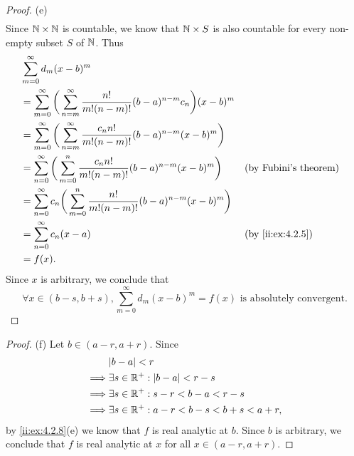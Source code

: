 \begin{proof}{(e)}
\begin{align*}
  \end{align*}
  Since \(\mathbb{N} \times \mathbb{N}\) is countable, we know that \(\mathbb{N} \times S\) is also countable for every non-empty subset \(S\) of \(\mathbb{N}\).
  Thus
  \begin{align*}
     & \sum_{m = 0}^\infty d_m (x - b)^m                                                                                                             \\
     & = \sum_{m = 0}^\infty \bigg(\sum_{n = m}^\infty \dfrac{n!}{m! (n - m)!} (b - a)^{n - m} c_n\bigg) (x - b)^m                                   \\
     & = \sum_{m = 0}^\infty \bigg(\sum_{n = m}^\infty \dfrac{c_n n!}{m! (n - m)!} (b - a)^{n - m} (x - b)^m\bigg)                                   \\
     & = \sum_{n = 0}^\infty \bigg(\sum_{m = 0}^n \dfrac{c_n n!}{m! (n - m)!} (b - a)^{n - m} (x - b)^m\bigg)      &  & \text{(by Fubini's theorem)} \\
     & = \sum_{n = 0}^\infty c_n \bigg(\sum_{m = 0}^n \dfrac{n!}{m! (n - m)!} (b - a)^{n - m} (x - b)^m\bigg)                                        \\
     & = \sum_{n = 0}^\infty c_n (x - a)                                                                           &  & \by{ii:ex:4.2.5}             \\
     & = f(x).
  \end{align*}
  Since \(x\) is arbitrary, we conclude that
  \[
    \forall x \in (b - s, b + s), \sum_{m = 0}^\infty d_m (x - b)^m = f(x) \text{ is absolutely convergent}.
  \]
\end{proof}

\begin{proof}{(f)}
  Let \(b \in (a - r, a + r)\).
  Since
  \begin{align*}
             & \abs{b - a} < r                                     \\
    \implies & \exists s \in \R^+ : \abs{b - a} < r - s            \\
    \implies & \exists s \in \R^+ : s - r < b - a < r - s          \\
    \implies & \exists s \in \R^+ : a - r < b - s < b + s < a + r,
  \end{align*}
  by \cref{ii:ex:4.2.8}(e) we know that \(f\) is real analytic at \(b\).
  Since \(b\) is arbitrary, we conclude that \(f\) is real analytic at \(x\) for all \(x \in (a - r, a + r)\).
\end{proof}
